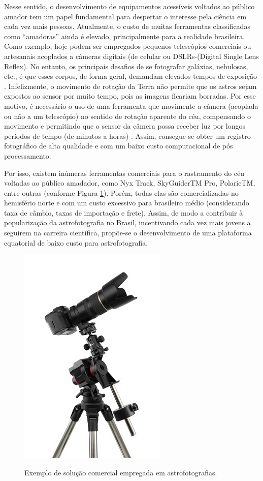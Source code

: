 Nesse sentido, o desenvolvimento de equipamentos acessíveis voltados ao público amador tem um papel fundamental para despertar o interesse pela ciência em cada vez mais pessoas. Atualmente, o custo de muitas ferramentas classificadas como “amadoras” ainda é elevado, principalmente para a realidade brasileira. Como exemplo, hoje podem ser empregados pequenos telescópios comerciais ou artesanais acoplados a câmeras digitais (de celular ou DSLRs-(Digital Single Lens Reflex). No entanto, os principais desafios de se fotografar galáxias, nebulosas, etc., é que esses corpos, de forma geral, demandam elevados tempos de exposição \cite{site:introCabau}. Infelizmente, o movimento de rotação da Terra não permite que os astros sejam expostos ao sensor por muito tempo, pois as imagens ficariam borradas. Por esse motivo, é necessário o uso de uma ferramenta que movimente a câmera (acoplada ou não a um telescópio) no sentido de rotação aparente do céu, compensando o movimento e permitindo que o sensor da câmera possa receber luz por longos períodos de tempo (de minutos a horas) \cite{site:introCabau}. Assim, consegue-se obter um registro fotográfico de alta qualidade e com um baixo custo computacional de pós processamento.


Por isso, existem inúmeras ferramentas comerciais para o rastramento do céu voltadas ao público amadador, como Nyx Track, SkyGuiderTM Pro, PolarieTM, entre outras (conforme Figura \ref{fig:skyguider}). Porém, todas elas são comercializadas no hemisfério norte e com um custo excessivo para brasileiro médio (considerando taxa de câmbio, taxas de importação e frete). Assim, de modo a contribuir à popularização da astrofotografia no Brasil, incentivando cada vez mais jovens a seguirem na carreira científica, propõe-se o desenvolvimento de uma plataforma equatorial de baixo custo para astrofotografia.


\begin{figure}[htb]
	\centering
	\caption{Exemplo de solução comercial empregada em astrofotografias. }
	\includegraphics[width=0.3\linewidth]{figuras/skyguider}
	\label{fig:skyguider}
\end{figure}

